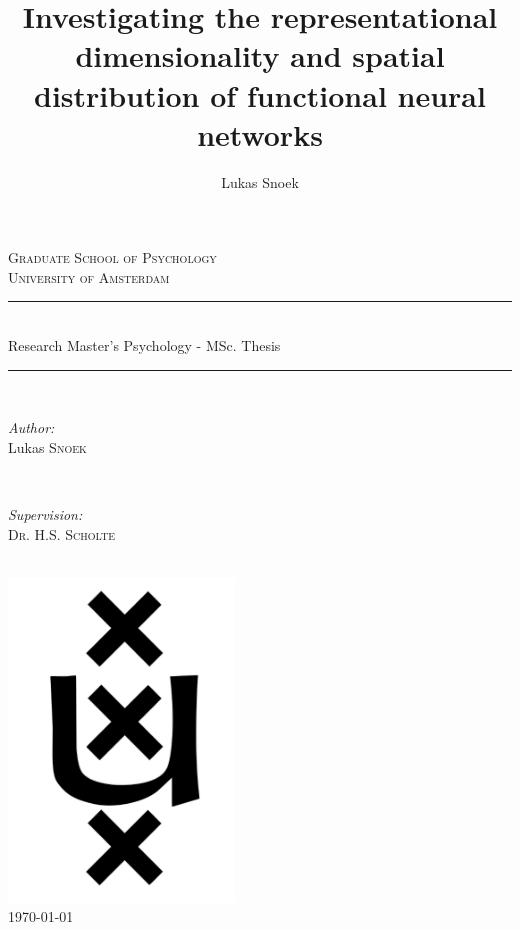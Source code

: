 \documentclass[jou,12pt,a4paper]{apa6}\usepackage[]{graphicx}\usepackage[]{color}
\title{\Large Investigating the representational dimensionality and spatial distribution of functional neural networks}
\author{Lukas Snoek}
\affiliation{University of Amsterdam\\[\baselineskip]
\large Research Master Psychology}
\begin{document}

\begin{titlepage}

\newcommand{\HRule}{\rule{\linewidth}{0.5mm}} 
\center 

\textsc{\LARGE Graduate School of Psychology}\\[1cm] 
\textsc{\Large University of Amsterdam}\\[1cm]

\HRule \\[0.4cm]
{ \huge Research Master's Psychology - MSc. Thesis}\\[0.4cm] 
\HRule \\[1.5cm]
 
\begin{minipage}{0.4\textwidth}
\begin{flushleft} \large
\emph{Author:}\\
Lukas \textsc{Snoek} 
\end{flushleft}
\end{minipage}
~
\begin{minipage}{0.4\textwidth}
\begin{flushright} \large
\emph{Supervision:} \\
\textsc{Dr. H.S. Scholte} 
\end{flushright}
\end{minipage}\\[1cm]

\includegraphics[width=60mm]{uva_logo_inv}\\[1cm] 

{\large \today}\\[2cm]

\vfill 

\end{titlepage}
\end{document}
